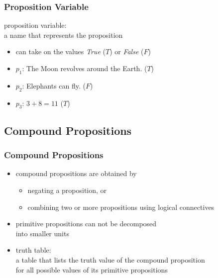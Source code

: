 \documentclass[dvipsnames]{beamer}
\begin{document}
\begin{frame}
  \frametitle{Proposition Variable}

  \begin{definition}
    \alert{proposition variable}:\\
      a name that represents the proposition

    \begin{itemize}
      \item can take on the values \emph {True} ($T$) or \emph{False} ($F$)
    \end{itemize}
  \end{definition}

  \pause
  \begin{example}
    \begin{itemize}
      \item $p_1$: The Moon revolves around the Earth. ($T$)
      \item $p_2$: Elephants can fly. ($F$)
      \item $p_3$: $3+8=11$ ($T$)
    \end{itemize}
  \end{example}
\end{frame}

\subsection{Compound Propositions}

\begin{frame}
  \frametitle{Compound Propositions}

  \begin{itemize}
    \item \alert{compound propositions} are obtained by
    \begin{itemize}
      \item negating a proposition, or
      \item combining two or more propositions using \alert{logical connectives}
    \end{itemize}
    \item \alert{primitive propositions} can not be decomposed\\
      into smaller units
  \end{itemize}

  \pause
  \begin{itemize}
    \item \alert{truth table}:\\
      a table that lists the truth value of the compound proposition\\
      for all possible values of its primitive propositions
  \end{itemize}
\end{frame}
\end{document}
